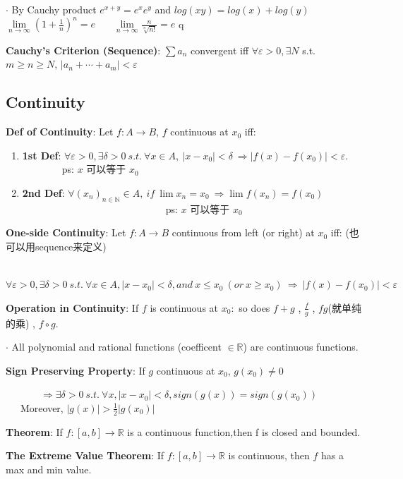 \documentclass[11pt]{article}
\begin{document}
$\cdot$ By Cauchy product $e^{x+y}=e^xe^y$ and $log(xy)=log(x)+log(y)$ \ \ \ \ \ $\lim\limits_{n\to\infty}(1 + \frac{1}{n})^n=e$ \ \ \ $\lim\limits_{n\to\infty}\frac{n}{\sqrt[n]{n!}}=e$ q

\textbf{Cauchy's Criterion (Sequence)}: $\sum a_n$ convergent iff $\forall \varepsilon>0,\exists N$ s.t. $m\geq n\geq N$, $|a_n+\cdots+a_m|<\varepsilon$

\subsection{Continuity}

\textbf{Def of Continuity}: Let $f:A \to B$, $f$ continuous at $x_0$ iff:
\begin{enumerate}[itemsep=-2pt, topsep=-2pt]
    \item \textbf{1st Def}: $\forall\varepsilon>0,\exists\delta>0 \ s.t. \ \forall x \in A, \ |x-x_0|<\delta \ \Rightarrow |f(x)-f(x_0)|<\varepsilon.$ \ \ \ \ \ \ \ \ ps: $x$ 可以等于 $x_0$
    \item \textbf{2nd Def}: $\forall (x_n)_{n\in \mathbb{N}}\in A,\ if \ \lim x_n = x_0 \ \Rightarrow \lim f(x_n)=f(x_0)$ \ \ \ \ \ \ \ \ \ \ \ \ \ \ \ \ \ \ \ \ \ \ \ \ \ \ \ \ \ ps: $x$ 可以等于 $x_0$
\end{enumerate}

\textbf{One-side Continuity}: Let $f:A \to B$ continuous from left (or right) at $x_0$ iff: {\small (也可以用sequence来定义)}

\ \ \ \ \ \ \ $\forall\varepsilon>0,\exists\delta>0 \ s.t. \ \forall x\in A , |x-x_0|<\delta , and \ x\leq x_0 \ (or \ x\geq x_0) \ \Rightarrow \ |f(x)-f(x_0)|<\varepsilon$

\textbf{Operation in Continuity}: If $f$ is continuous at $x_0:$ so does $f+g$ , $\frac{f}{g}$ , $fg$(就单纯的乘) , $f\circ g$.

$\cdot$ All polynomial and rational functions (coefficent $\in \mathbb{R}$) are continuous functions.

\textbf{Sign Preserving Property}: If $g$ continuous at $x_0$, $g(x_0)\ne 0$

\ \ \ \ \ \ \ $\Rightarrow\exists\delta>0 \ s.t. \ \forall x,|x-x_0|<\delta,sign(g(x))=sign(g(x_0))$ \ \ \ Moreover, $|g(x)|>\frac{1}{2}|g(x_0)|$

\textbf{Theorem}: If $f:[a,b]\to\mathbb{R}$ is a continuous function,then f is closed and bounded.

\textbf{The Extreme Value Theorem}: If $f:[a,b]\to\mathbb{R}$ is continuous, then $f$ has a max and min value.
\end{document}
